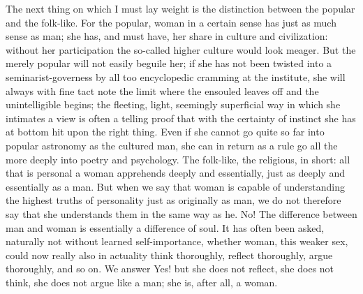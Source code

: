 \documentclass[12pt]{book}
\newcommand{\opage}[1]{\marginnote{\footnotesize\textit{[#1]}}}
\begin{document}
The next thing on which I must lay weight is the distinction between the
popular and the folk-like. For the popular, woman in a certain sense has
just as much sense as man; she has, and must have, her share in culture
and civilization: without her participation the so-called higher culture
would look meager. But the merely popular will not easily beguile her; if
she has not been twisted into a seminarist-governess by all too
encyclopedic cramming at the institute, she will always with fine tact
note the limit where the ensouled leaves off and the unintelligible
begins; the fleeting, light, seemingly superficial way in which she
intimates a view is often a telling proof that with the certainty of
instinct she has at bottom hit upon the right thing. Even if she cannot go
quite so far into popular astronomy as the cultured man, she can in return
as a rule go all the more deeply into poetry and psychology. The
folk-like, the religious, in short: all that is personal a woman
apprehends deeply and essentially, just as deeply and essentially as a
man. But when we say that woman is capable of understanding the highest
truths of personality just as originally as
\opage{285}\setcounter{footnote}{0}%
man, we do not therefore say that she understands them in the same way as
he. No! The difference between man and woman is essentially a difference
of soul. It has often been asked, naturally not without learned
self-importance, whether woman, this weaker sex, could now really also in
actuality think thoroughly, reflect thoroughly, argue thoroughly, and so
on. We answer Yes! but she does not reflect, she does not think, she does
not argue like a man; she is, after all, a woman.
\end{document}

